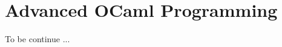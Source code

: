 \documentclass[10pt]{beamer}
\begin{document}
	\section{Advanced OCaml Programming}
	
	\newpage
	{
		\begin{frame}[standout]
			To be continue ...
		\end{frame}
	}
	
	
\end{document}
